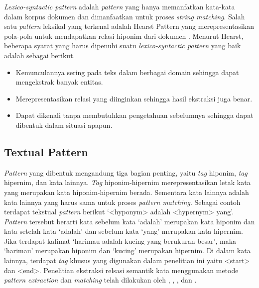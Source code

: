\textit{Lexico-syntactic pattern} adalah \textit{pattern} yang hanya memanfatkan kata-kata dalam korpus dokumen dan dimanfaatkan untuk proses \textit{string matching}. Salah satu \textit{pattern} leksikal yang terkenal adalah Hearst Pattern yang merepresentasikan pola-pola untuk mendapatkan relasi hiponim dari dokumen \citep{hearst1992automatic}. Menurut Hearst, beberapa syarat yang harus dipenuhi suatu \textit{lexico-syntactic pattern} yang baik adalah sebagai berikut.
\begin{itemize}
  \item Kemunculannya sering pada teks dalam berbagai domain sehingga dapat mengekstrak banyak entitas.
  \item Merepresentasikan relasi yang diinginkan sehingga hasil ekstraksi juga benar.
  \item Dapat dikenali tanpa membutuhkan pengetahuan sebelumnya sehingga dapat dibentuk dalam situasi apapun.
\end{itemize}

\subsection{Textual Pattern}
\textit{Pattern} yang dibentuk mengandung tiga bagian penting, yaitu \textit{tag} hiponim, \textit{tag} hipernim, dan kata lainnya. \textit{Tag} hiponim-hipernim merepresentasikan letak kata yang merupakan kata hiponim-hipernim berada. Sementara kata lainnya adalah kata lainnya yang harus sama untuk proses \textit{pattern matching}. Sebagai contoh terdapat tekstual \textit{pattern} berikut `{\selectfont<hyponym>} adalah {\selectfont<hypernym>} yang'. \textit{Pattern} tersebut berarti kata sebelum kata `adalah' merupakan kata hiponim dan kata setelah kata `adalah' dan sebelum kata `yang' merupakan kata hipernim. Jika terdapat kalimat `harimau adalah kucing yang berukuran besar', maka `harimau' merupakan hiponim dan `kucing' merupakan hipernim. Di dalam kata lainnya, terdapat \textit{tag} khusus yang digunakan dalam penelitian ini yaitu {\selectfont<start>} dan {\selectfont<end>}. Penelitian ekstraksi relsasi semantik kata menggunakan metode \textit{pattern extraction} dan \textit{matching} telah dilakukan oleh \cite{hearst1992automatic}, \cite{ruiz2005automatic}, \cite{arnold2014extracting}, dan \cite{sumida2008hacking}.

